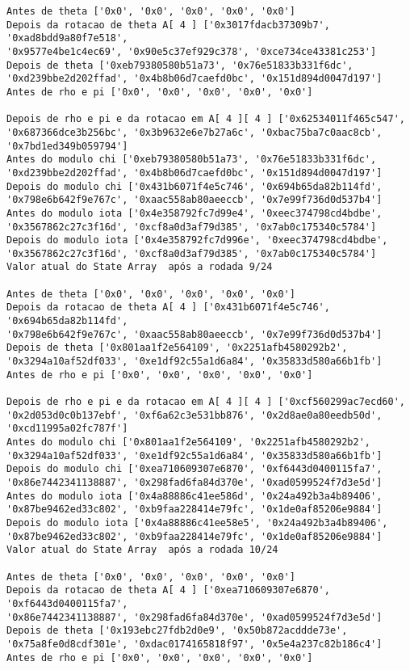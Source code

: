 \documentclass[12pt, a4paper]{article}
\begin{document}
\begin{enumerate}
\begin{enumerate}
\begin{verbatim}
Antes de theta ['0x0', '0x0', '0x0', '0x0', '0x0']
Depois da rotacao de theta A[ 4 ] ['0x3017fdacb37309b7', '0xad8bdd9a80f7e518',
'0x9577e4be1c4ec69', '0x90e5c37ef929c378', '0xce734ce43381c253']
Depois de theta ['0xeb79380580b51a73', '0x76e51833b331f6dc',
'0xd239bbe2d202ffad', '0x4b8b06d7caefd0bc', '0x151d894d0047d197']
Antes de rho e pi ['0x0', '0x0', '0x0', '0x0', '0x0']

Depois de rho e pi e da rotacao em A[ 4 ][ 4 ] ['0x62534011f465c547',
'0x687366dce3b256bc', '0x3b9632e6e7b27a6c', '0xbac75ba7c0aac8cb',
'0x7bd1ed349b059794']
Antes do modulo chi ['0xeb79380580b51a73', '0x76e51833b331f6dc',
'0xd239bbe2d202ffad', '0x4b8b06d7caefd0bc', '0x151d894d0047d197']
Depois do modulo chi ['0x431b6071f4e5c746', '0x694b65da82b114fd',
'0x798e6b642f9e767c', '0xaac558ab80aeeccb', '0x7e99f736d0d537b4']
Antes do modulo iota ['0x4e358792fc7d99e4', '0xeec374798cd4bdbe',
'0x3567862c27c3f16d', '0xcf8a0d3af79d385', '0x7ab0c175340c5784']
Depois do modulo iota ['0x4e358792fc7d996e', '0xeec374798cd4bdbe',
'0x3567862c27c3f16d', '0xcf8a0d3af79d385', '0x7ab0c175340c5784']
Valor atual do State Array  após a rodada 9/24

Antes de theta ['0x0', '0x0', '0x0', '0x0', '0x0']
Depois da rotacao de theta A[ 4 ] ['0x431b6071f4e5c746', '0x694b65da82b114fd',
'0x798e6b642f9e767c', '0xaac558ab80aeeccb', '0x7e99f736d0d537b4']
Depois de theta ['0x801aa1f2e564109', '0x2251afb4580292b2',
'0x3294a10af52df033', '0xe1df92c55a1d6a84', '0x35833d580a66b1fb']
Antes de rho e pi ['0x0', '0x0', '0x0', '0x0', '0x0']

Depois de rho e pi e da rotacao em A[ 4 ][ 4 ] ['0xcf560299ac7ecd60',
'0x2d053d0c0b137ebf', '0xf6a62c3e531bb876', '0x2d8ae0a80eedb50d',
'0xcd11995a02fc787f']
Antes do modulo chi ['0x801aa1f2e564109', '0x2251afb4580292b2',
'0x3294a10af52df033', '0xe1df92c55a1d6a84', '0x35833d580a66b1fb']
Depois do modulo chi ['0xea710609307e6870', '0xf6443d0400115fa7',
'0x86e7442341138887', '0x298fad6fa84d370e', '0xad0599524f7d3e5d']
Antes do modulo iota ['0x4a88886c41ee586d', '0x24a492b3a4b89406',
'0x87be9462ed33c802', '0xb9faa228414e79fc', '0x1de0af85206e9884']
Depois do modulo iota ['0x4a88886c41ee58e5', '0x24a492b3a4b89406',
'0x87be9462ed33c802', '0xb9faa228414e79fc', '0x1de0af85206e9884']
Valor atual do State Array  após a rodada 10/24

Antes de theta ['0x0', '0x0', '0x0', '0x0', '0x0']
Depois da rotacao de theta A[ 4 ] ['0xea710609307e6870', '0xf6443d0400115fa7',
'0x86e7442341138887', '0x298fad6fa84d370e', '0xad0599524f7d3e5d']
Depois de theta ['0x193ebc27fdb2d0e9', '0x50b872acddde73e',
'0x75a8fe0d8cdf301e', '0xdac0174165818f97', '0x5e4a237c82b186c4']
Antes de rho e pi ['0x0', '0x0', '0x0', '0x0', '0x0']


\end{verbatim}
\end{enumerate}
\end{enumerate}
\end{document}
